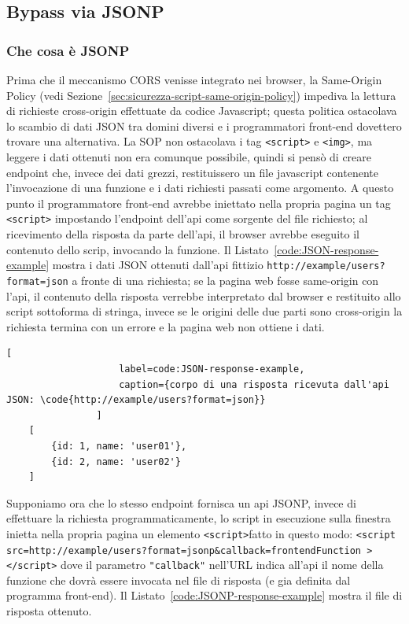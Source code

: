 \documentclass{sapthesis}
\newcommand{\code}[1]{\texttt{#1}}
\newcommand{\refSection}[1]{Sezione~\ref{#1}}
\newcommand{\refCode}[1]{Listato~\ref{#1}}
\newcommand{\JS}{Javascript}
\newcommand{\tagHTML}[1]{\code{<#1>}}
\newcommand{\img}{\tagHTML{img}}
\newcommand{\script}{\tagHTML{script}}
\begin{document}
            \subsection{Bypass via JSONP}
                \subsubsection{Che cosa è JSONP}
                Prima che il meccanismo CORS venisse integrato nei browser, la Same-Origin Policy (vedi \refSection{sec:sicurezza-script-same-origin-policy}) 
                impediva la lettura di richieste cross-origin effettuate da codice \JS{}; questa politica ostacolava
                lo scambio di dati JSON tra domini diversi e i programmatori front-end dovettero trovare una
                alternativa. La SOP non ostacolava i tag \script{} e \img{}, ma leggere i dati ottenuti non era
                comunque possibile, quindi si pensò di creare endpoint che, invece dei dati grezzi, restituissero
                un file javascript contenente l'invocazione di una funzione e i dati richiesti passati come argomento.
                A questo punto il programmatore front-end avrebbe iniettato nella propria pagina un tag \script{}
                impostando l'endpoint dell'api come sorgente del file richiesto; al ricevimento della risposta 
                da parte dell'api, il browser avrebbe eseguito il contenuto dello scrip, invocando la funzione.
                Il \refCode{code:JSON-response-example} mostra i dati JSON ottenuti dall'api fittizio
                \code{http://example/users?format=json} a fronte di una richiesta; se la pagina web fosse
                same-origin con l'api, il contenuto della risposta verrebbe interpretato dal browser e restituito
                allo script sottoforma di stringa, invece se le origini delle due parti sono cross-origin la richiesta
                termina con un errore e la pagina web non ottiene i dati.\\

                \begin{lstlisting}[
                    label=code:JSON-response-example,
                    caption={corpo di una risposta ricevuta dall'api JSON: \code{http://example/users?format=json}}
                ]
    [
        {id: 1, name: 'user01'},
        {id: 2, name: 'user02'}
    ]
                \end{lstlisting}

                Supponiamo ora che lo stesso endpoint fornisca un api JSONP, invece di effettuare la richiesta
                programmaticamente, lo script in esecuzione sulla finestra inietta nella propria pagina un
                elemento \script fatto in questo modo: \code{<script src=http://example/users?format=jsonp\&callback=frontendFunction ></script>}
                dove il parametro \code{"callback"} nell'URL indica all'api il nome della funzione che dovrà essere
                invocata nel file di risposta (e gia definita dal programma front-end). Il \refCode{code:JSONP-response-example}
                mostra il file di risposta ottenuto.
\end{document}
